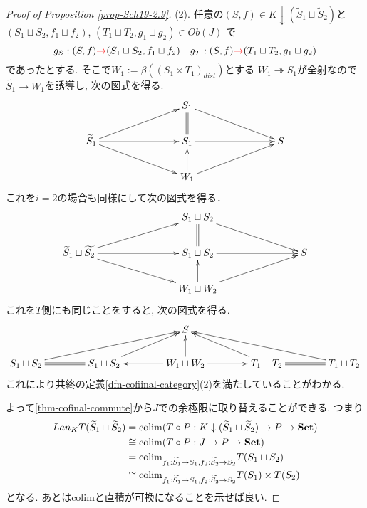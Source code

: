 \documentclass[dvipdfmx,a4paper,11pt]{article}
\newcommand{\colim}{{\rm colim}}
\theoremstyle{definition}
\newcommand{\xr}[1]{\textcolor{red}{#1}}
\begin{document}
\begin{proof}[Proof of Proposition \ref{prop-Sch19-2.9}]
(2). 任意の$(S, f) \in K \downarrow  (\widetilde{S}_1 \sqcup  \widetilde{S}_2)$と
$(S_1 \sqcup  S_2, f_1 \sqcup  f_2)$, $(T_1 \sqcup  T_2, g_1 \sqcup  g_2) \in Ob(J)$ で
$$
g_{S} : (S, f) \xr{\to}(S_1 \sqcup  S_2, f_1 \sqcup  f_2)
\quad
g_{T} : (S, f) \xr{\to}(T_1 \sqcup  T_2, g_1 \sqcup  g_2)
$$
であったとする.
そこで$W_1 := \beta((S_1\times T_1)_{dist})$とする
$W_1 \twoheadrightarrow S_1$が全射なので$\widetilde{S_1} \to W_1$を誘導し, 次の図式を得る. 
\begin{equation*}
\label{eq-conti}
\xymatrix@C=78pt@R=20pt{
&S_1 \ar@{->}[rd]\ar@{=}[d]
& 
\\
\widetilde{S}_1 
 \ar@{->}[r] \ar@{->}[rd]\ar@{->}[ru]
&S_1  \ar@{->}[r] 
& S
\\
&W_1 \ar@{->}[ru] \ar@{->}[u]
& 
\\
}
\end{equation*}
これを$i=2$の場合も同様にして次の図式を得る．
\begin{equation*}
\label{eq-conti}
\xymatrix@C=78pt@R=20pt{
&S_1\sqcup S_2 \ar@{->}[rd]\ar@{=}[d]
& 
\\
\widetilde{S}_1 \sqcup \widetilde{S_2}
 \ar@{->}[r] \ar@{->}[rd]\ar@{->}[ru]
&S_1 \sqcup S_2  \ar@{->}[r] 
& S
\\
&W_1\sqcup W_2 \ar@{->}[ru] \ar@{->}[u]
& 
\\
}
\end{equation*}
これを$T$側にも同じことをすると, 次の図式を得る. 
\begin{equation*}
\label{eq-conti}
\xymatrix@C=40pt@R=20pt{
&
&
S&
&
\\
S_1 \sqcup S_2\ar@{->}[rru] \ar@{=}[r]&
S_1 \sqcup S_2\ar@{->}[ru]&
W_1 \sqcup W_2\ar@{->}[u] \ar@{->}[r] \ar@{->}[l]&
T_1 \sqcup T_2\ar@{->}[lu]\ar@{=}[r]&
T_1 \sqcup T_2 \ar@{->}[llu]
}
\end{equation*}
これにより共終の定義\ref{dfn-cofiinal-category}(2)を満たしていることがわかる.

よって\ref{thm-cofinal-commute}から$J$での余極限に取り替えることができる. つまり
\begin{align*}
\begin{split}
Lan_{K}T (\widetilde{S}_1 \sqcup  \widetilde{S}_2) 
&=
\colim(T \circ P : K \downarrow  (\widetilde{S}_1 \sqcup  \widetilde{S}_2) \to P \to {\bf Set}) \\
&\cong
\colim(T \circ P : J   \to P \to {\bf Set}) \\
&=
\colim_{f_1: \widetilde{S_1} \to S_1,  f_2: \widetilde{S_2} \to S_2} T(S_1 \sqcup  S_2) \\
& \cong 
\colim_{f_1 : \widetilde{S_1} \to S_1,  f_2: \widetilde{S_2} \to S_2} T(S_1) \times  T( S_2)
\end{split}
\end{align*}
となる.
あとはcolimと直積が可換になることを示せば良い.


\end{proof}
\end{document}

